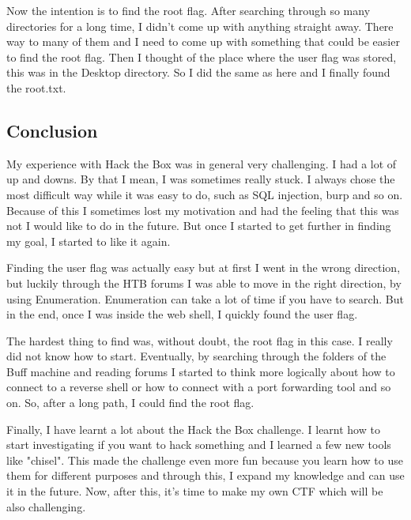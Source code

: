 \documentclass[../main.tex]{subfiles}
\begin{document}
Now the intention is to find the root flag. After searching through so many directories for a long time, I didn't come up with anything straight away. There way to many of them and I need to come up with something that could be easier to find the root flag. Then I thought of the place where the user flag was stored, this was in the Desktop directory. So I did the same as here and I finally found the root.txt.  

\subsection{Conclusion}

My experience with Hack the Box was in general very challenging. I had a lot of up and downs. By that I mean, I was sometimes really stuck. I always chose the most difficult way while it was easy to do, such as SQL injection, burp and so on.  Because of this I sometimes lost my motivation and had the feeling that this was not I would like to do in the future. But once I started to get further in finding my goal, I started to like it again. 

Finding the user flag was actually easy but at first I went in the wrong direction, but luckily through the HTB forums I was able to move in the right direction, by using Enumeration. Enumeration can take a lot of time if you have to search. But in the end, once I was inside the web shell, I quickly found the user flag.  

The hardest thing to find was, without doubt, the root flag in this case. I really did not know how to start. Eventually, by searching through the folders of the Buff machine and reading forums I started to think more logically about how to connect to a reverse shell or how to connect with a port forwarding tool and so on. So, after a long path, I could find the root flag. 

Finally,  I have learnt a lot about the Hack the Box challenge. I learnt how to start investigating if you want to hack something and I learned a few new tools like "chisel". This made the challenge even more fun because you learn how to use them for different purposes and through this, I expand my knowledge and can use it in the future. Now, after this, it's time to make my own CTF which will be also challenging. 
\end{document}
